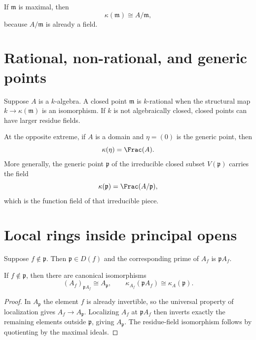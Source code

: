 

\begin{corollary}
If $\mathfrak m$ is maximal, then
\[
\kappa(\mathfrak m)\cong A/\mathfrak m,
\]
because $A/\mathfrak m$ is already a field.
\end{corollary}

\section{Rational, non-rational, and generic points}

Suppose $A$ is a $k$-algebra.  A closed point $\mathfrak m$ is $k$-rational when the
structural map $k\to\kappa(\mathfrak m)$ is an isomorphism.  If $k$ is not algebraically
closed, closed points can have larger residue fields.

At the opposite extreme, if $A$ is a domain and $\eta=(0)$ is the generic point, then
\[
\kappa(\eta)=\Frac(A).
\]
More generally, the generic point $\mathfrak p$ of the irreducible closed subset
$V(\mathfrak p)$ carries the field
\[
\kappa(\mathfrak p)=\Frac(A/\mathfrak p),
\]
which is the function field of that irreducible piece.



\section{Local rings inside principal opens}

Suppose $f\notin\mathfrak p$.  Then $\mathfrak p\in D(f)$ and the corresponding prime of
$A_f$ is $\mathfrak pA_f$.

\begin{proposition}
If $f\notin\mathfrak p$, then there are canonical isomorphisms
\[
(A_f)_{\mathfrak pA_f}\cong A_{\mathfrak p},
\qquad
\kappa_{A_f}(\mathfrak pA_f)\cong\kappa_A(\mathfrak p).
\]
\end{proposition}

\begin{proof}
In $A_{\mathfrak p}$ the element $f$ is already invertible, so the universal property of
localization gives $A_f\to A_{\mathfrak p}$.  Localizing $A_f$ at
$\mathfrak pA_f$ then inverts exactly the remaining elements outside $\mathfrak p$, giving
$A_{\mathfrak p}$.  The residue-field isomorphism follows by quotienting by the maximal
ideals.
\end{proof}

